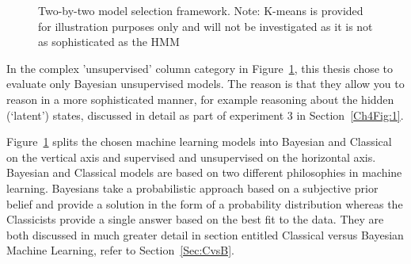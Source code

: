 \begin{figure}[!ht]\centering
    \caption{Two-by-two model selection framework. Note: K-means is provided for illustration purposes only and will not be investigated as it is not as sophisticated as the HMM}\label{Ch1Fig:5}
\end{figure}

In the complex 'unsupervised' column category in Figure~\ref{Ch1Fig:5}, this thesis chose to evaluate only Bayesian unsupervised models. The reason is that they allow you to reason in a more sophisticated manner, for example reasoning about the hidden (`latent') states, discussed in detail as part of experiment 3 in Section~\ref{Ch4Fig:1}.

Figure~\ref{Ch1Fig:5} splits the chosen machine learning models into Bayesian and Classical on the vertical axis and supervised and unsupervised on the horizontal axis. Bayesian and Classical models are based on two different philosophies in machine learning. Bayesians take a probabilistic approach based on a subjective prior belief and provide a solution in the form of a probability distribution whereas the Classicists provide a single answer based on the best fit to the data. They are both discussed in much greater detail in section entitled Classical versus Bayesian Machine Learning, refer to Section~\ref{Sec:CvsB}.

